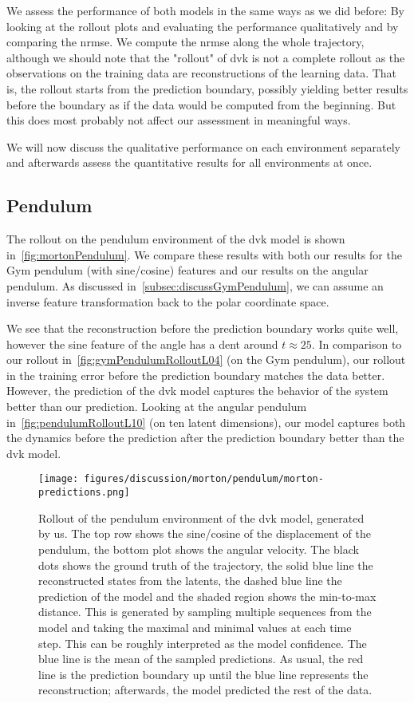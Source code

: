 	We assess the performance of both models in the same ways as we did before: By looking at the rollout plots and evaluating the performance qualitatively and by comparing the \acrlong{nrmse}. We compute the \ac{nrmse} along the whole trajectory, although we should note that the "rollout" of \ac{dvk} is not a complete rollout as the observations on the training data are reconstructions of the learning data. That is, the rollout starts from the prediction boundary, possibly yielding better results before the boundary as if the data would be computed from the beginning. But this does most probably not affect our assessment in meaningful ways.

	We will now discuss the qualitative performance on each environment separately and afterwards assess the quantitative results for all environments at once.

	\subsection{Pendulum}
		The rollout on the pendulum environment of the \ac{dvk} model is shown in~\autoref{fig:mortonPendulum}. We compare these results with both our results for the Gym pendulum (with sine/cosine) features and our results on the angular pendulum. As discussed in~\autoref{subsec:discussGymPendulum}, we can assume an inverse feature transformation back to the polar coordinate space.

		We see that the reconstruction before the prediction boundary works quite well, however the sine feature of the angle has a dent around \( t \approx 25 \). In comparison to our rollout in~\autoref{fig:gymPendulumRolloutL04} (on the Gym pendulum), our rollout in the training error before the prediction boundary matches the data better. However, the prediction of the \ac{dvk} model captures the behavior of the system better than our prediction. Looking at the angular pendulum in~\autoref{fig:pendulumRolloutL10} (on ten latent dimensions), our model captures both the dynamics before the prediction after the prediction boundary better than the \ac{dvk} model.

		\begin{figure}
			\centering
			\texttt{[image: figures/discussion/morton/pendulum/morton-predictions.png]}
			\caption[Rollout of the pendulum environment of the DVK model]{Rollout of the pendulum environment of the \ac{dvk} model, generated by us. The top row shows the sine/cosine of the displacement of the pendulum, the bottom plot shows the angular velocity. The black dots shows the ground truth of the trajectory, the solid blue line the reconstructed states from the latents, the dashed blue line the prediction of the model and the shaded region shows the min-to-max distance. This is generated by sampling multiple sequences from the model and taking the maximal and minimal values at each time step. This can be roughly interpreted as the model confidence. The blue line is the mean of the sampled predictions. As usual, the red line is the prediction boundary up until the blue line represents the reconstruction; afterwards, the model predicted the rest of the data.}
			\label{fig:mortonPendulum}
		\end{figure}

